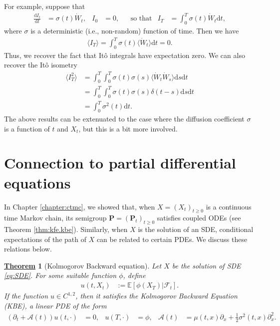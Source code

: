 \documentclass[12pt]{book}
\let\varphi\phi
\numberwithin{equation}{chapter}
\theoremstyle{plain}
\newtheorem{theorem}{\underline{Theorem}}
\numberwithin{theorem}{section}
\theoremstyle{definition}
\numberwithin{exercise}{chapter}
\newcommand{\<}{\langle}
\renewcommand{\>}{\rangle}
\renewcommand{\(}{\left(}
\renewcommand{\)}{\right)}
\renewcommand{\[}{\left[}
\renewcommand{\]}{\right]}
\newcommand\Eb{\mathds{E}}
\newcommand\Ac{\mathscr{A}}
\newcommand\Fc{\mathscr{F}}
\newcommand\sig{\sigma}
\newcommand\del{\delta}
\newcommand\Pv{\pmb{P}}
\newcommand\Wd{\dot{W}}
\renewcommand\d{\partial}
\newcommand\dd{\mathrm{d}}
\begin{document}
For example, suppose that
\begin{align}
\frac{\dd I_t }{\dd t}
	&=	\sig(t) \Wd_t , &
I_0
	&=	0 , &
	&\text{so that}&
I_T
	&=	\int_0^T \sig(t) \Wd_t \dd t ,
\end{align}
where $\sig$ is a deterministic (i.e., non-random) function of time.  Then we have
\begin{align}
\< I_T \>
	=		\int_0^T \sig(t)\< \Wd_t \> \dd t
	=		0 .
\end{align}
Thus, we recover the fact that It\^o integrals have expectation zero.  We can also recover the It\^o isometry
\begin{align}
\< I_T^2 \>
	&=	\int_0^T \int_0^T \sig(t) \sig(s) \< \Wd_t \Wd_s \> \dd s \dd t \\
	&=	\int_0^T \int_0^T \sig(t) \sig(s) \del(t-s) \dd s \dd t \\
	&=	\int_0^T \sig^2(t) \dd t .
\end{align}
The above results can be extenuated to the case where the diffusion coefficient $\sig$ is a function of $t$ and $X_t$, but this is a bit more involved.


\section{Connection to partial differential equations}
\label{sec:pde}

In Chapter \ref{chapter:ctmc}, we showed that, when $X = (X_t)_{t \geq 0}$ is a continuous time Markov chain, its semigroup $\Pv = (\Pv_t)_{t \geq 0}$ satisfies coupled ODEs (see Theorem \ref{thm:kfe.kbe}).  Similarly, when $X$ is the solution of an SDE, conditional expectations of the path of $X$ can be related to certain PDEs.  We discuss these relations below.

\begin{theorem}[Kolmogorov Backward equation]
\label{thm:kbe}
Let $X$ be the solution of SDE \eqref{eq:SDE}.  For some suitable function $\varphi$, define
\begin{align}
u(t,X_t)
	&:=	\Eb[ \varphi(X_T) | \Fc_t ] . \label{eq:u.def}
\end{align}
If the function $u \in C^{1,2}$, then it satisfies the \emph{Kolmogorov Backward Equation} (KBE), a linear PDE of the form
\begin{align}
( \d_t + \Ac(t) ) u(t,\cdot)
	&=	0 , &
u(T,\cdot)
	&=	\varphi , &
\Ac(t)
	&=	\mu(t,x) \d_x + \tfrac{1}{2} \sig^2(t,x) \d_x^2 . \label{eq:u.pde}
\end{align}
\end{theorem}
\end{document}
